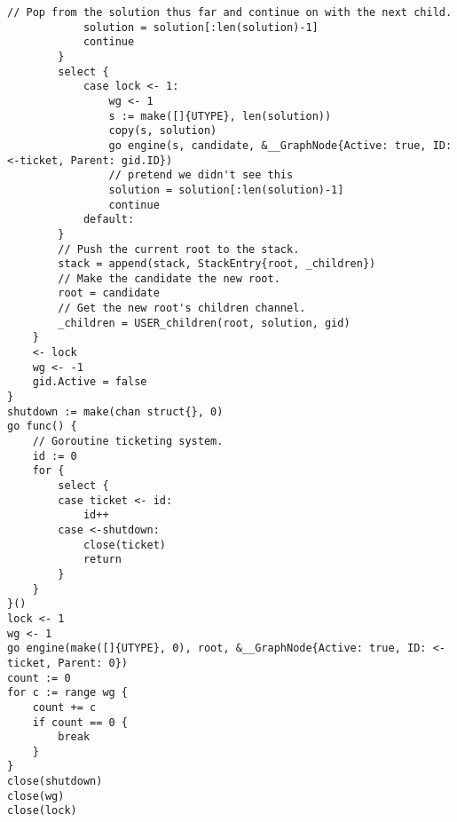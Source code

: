 \documentclass[runningheads]{llncs}
\begin{document}
\begin{lstlisting}[language=Golang, style=boxed]
			// Pop from the solution thus far and continue on with the next child.
			solution = solution[:len(solution)-1]
			continue
		}
		select {
			case lock <- 1:
				wg <- 1
				s := make([]{UTYPE}, len(solution))
				copy(s, solution)
				go engine(s, candidate, &__GraphNode{Active: true, ID: <-ticket, Parent: gid.ID})
				// pretend we didn't see this
				solution = solution[:len(solution)-1]
				continue
			default:
		}
		// Push the current root to the stack.
		stack = append(stack, StackEntry{root, _children})
		// Make the candidate the new root.
		root = candidate
		// Get the new root's children channel.
		_children = USER_children(root, solution, gid)
	}
	<- lock
	wg <- -1
	gid.Active = false
}
shutdown := make(chan struct{}, 0)
go func() {
	// Goroutine ticketing system.
	id := 0
	for {
		select {
		case ticket <- id:
			id++
		case <-shutdown:
			close(ticket)
			return
		}
	}
}()
lock <- 1
wg <- 1
go engine(make([]{UTYPE}, 0), root, &__GraphNode{Active: true, ID: <-ticket, Parent: 0})
count := 0
for c := range wg {
	count += c
	if count == 0 {
		break
	}
}
close(shutdown)
close(wg)
close(lock)
\end{lstlisting}
\end{document}
